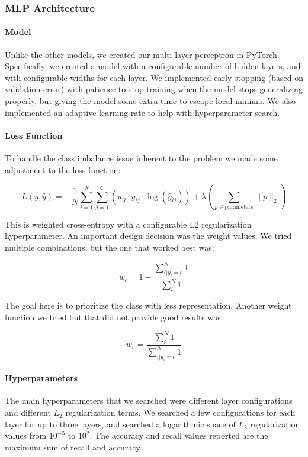 \documentclass[final]{cvpr}
\begin{document}
\subsubsection{MLP Architecture}

\paragraph{Model} Unlike the other models, we created our multi layer perceptron in PyTorch. Specifically, we created a model with a configurable number of hidden layers, and with configurable widths for each layer. We implemented early stopping (based on validation error) with patience to stop training when the model stops generalizing properly, but giving the model some extra time to escape local minima. We also implemented an adaptive learning rate to help with hyperparameter search.

\paragraph{Loss Function}To handle the class imbalance issue inherent to the problem we made some adjustment to the loss function:

\begin{equation}
L(y, \hat{y}) = - \frac{1}{N} \sum_{i=1}^{N} \sum_{j=1}^{C} (w_j \cdot y_{ij} \cdot \log(\hat{y}_{ij})) + \lambda (\sum\limits_{p \in \text{parameters}} \|p\|_2)
\end{equation}

This is weighted cross-entropy with a configurable L2 regularization hyperparameter. An important design decision was the weight values. We tried multiple combinations, but the one that worked best was:

\begin{equation}
w_{c} = 1-\dfrac{\sum_{i | y_i=c}^{N} 1}{\sum_{i}^{N} 1}
\end{equation}

The goal here is to prioritize the class with less representation. Another weight function we tried but that did not provide good results was:

\begin{equation}
w_{c} = \dfrac{\sum_{i}^{N} 1}{\sum_{i | y_i=c}^{N} 1}
\end{equation}

\paragraph{Hyperparameters} The main hyperparameters that we searched were different layer configurations and different $L_{2}$ regularization terms. We searched a few configurations for each layer for up to three layers, and searched a logarithmic space of $L_{2}$ regularization values from $10^{-5}$ to $10^{2}$. The accuracy and recall values reported are the maximum sum of recall and accuracy.
\end{document}
